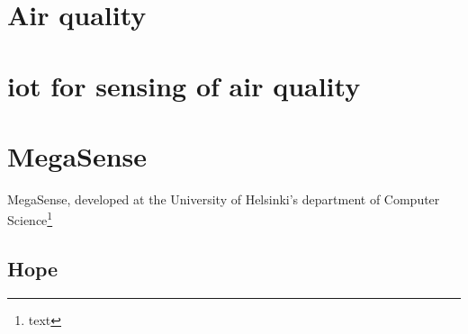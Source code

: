 		

\newpage
\section{Air quality}





\newpage
\section{iot for sensing of air quality}

\newpage
\section{MegaSense}

	MegaSense, developed at the University of Helsinki's department of Computer Science\footnote{text}

	\subsection{Hope}
